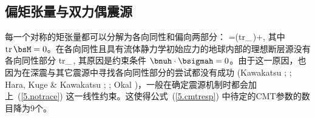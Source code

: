 \subsection{偏矩张量与双力偶震源}
%
%

每一个对称的矩张量都可以分解为各向同性和偏向两部分：
\eq
\bM=\third({\rm tr}_{\,}\bM)\bI+\bsM,
\en
其中 ${\rm tr}\,\bsM=0$。在各向同性且具有流体静力学初始应力的地球内部的理想断层源没有各向同性部分
\eq
\label{5.notrace}
{\rm tr}_{\,},
\en
其原因是约束条件 $\bnuh\cdot\bsigmah=0$。由于这一原因，也因为在深震与其它震源中寻找各向同性部分的尝试都没有成功 (Kawakatsu
\citeyear{kawakatsu91}; \citeyear{kawakatsu96};
Hara, Kuge \& Kawakatsu \citeyear{hara&al95}; \citeyear{hara&al96};
Okal \citeyear{okal96})，一般在确定震源机制时都会加上~(\ref{5.notrace}) 这一线性约束。这使得公式~(\ref{5.cmtresp}) 中待定的CMT参数的数目降为9个。

